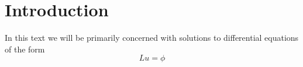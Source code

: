 \section{Introduction}
In this text we will be primarily concerned with solutions to differential equations of the form
\begin{equation}
    Lu=\phi
\end{equation}